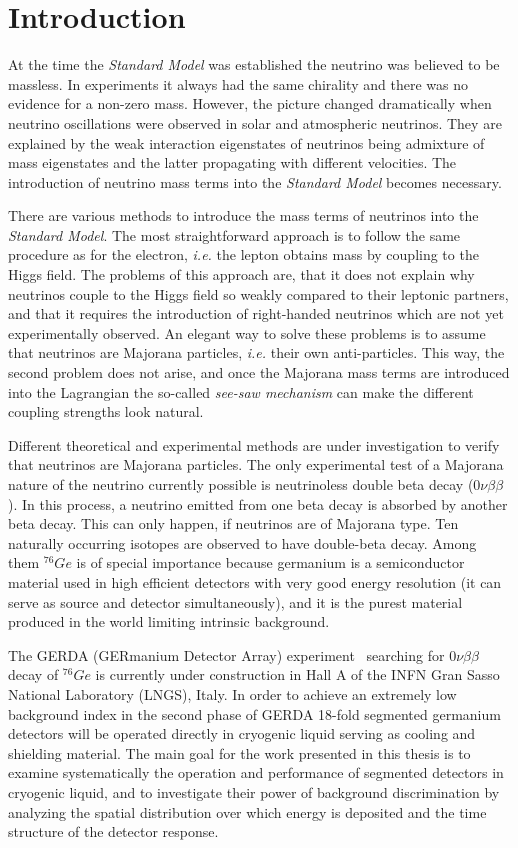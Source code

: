 \chapter{Introduction}
\label{cha:intro}
At the time the \emph{Standard Model} was established the neutrino was believed to be massless. In experiments it always had the same chirality and there was no evidence for a non-zero mass. However, the picture changed dramatically when neutrino oscillations were observed in solar and atmospheric neutrinos. They are explained by the weak interaction eigenstates of neutrinos being admixture of mass eigenstates and the latter propagating with different velocities. The introduction of neutrino mass terms into the \emph{Standard Model}
becomes necessary.

There are various methods to introduce the mass terms of neutrinos into the \emph{Standard Model}. The most straightforward approach is to follow the same procedure as for the electron, \textit{i.e.} the lepton obtains mass by coupling to the Higgs field. The problems of this approach are, that it does not explain why neutrinos couple to the Higgs field so weakly compared to their leptonic partners, and that it requires the introduction of right-handed neutrinos which are not yet experimentally observed. An elegant way to solve these problems is to assume that neutrinos are Majorana particles,
\textit{i.e.} their own anti-particles. This way, the second problem does not arise, and once the Majorana mass terms are introduced into the Lagrangian the so-called \emph{see-saw mechanism} can make the different coupling strengths look natural.

Different theoretical and experimental methods are under investigation to verify that neutrinos are Majorana particles. The only experimental test of a Majorana nature of the neutrino currently possible is neutrinoless double beta decay ($0\nu\beta\beta$). In this process, a neutrino emitted from one beta decay is absorbed by another beta decay. This can only happen, if neutrinos are of Majorana type. Ten naturally occurring isotopes are observed to have double-beta decay. Among them $^{76}Ge$ is of special importance because germanium is a semiconductor material used in high efficient detectors with very good energy resolution (it can serve as source and detector simultaneously), and it is the purest material produced in the world limiting intrinsic background.

The GERDA (GERmanium Detector Array) experiment~\cite{Abt04, Sch05} searching for $0\nu\beta\beta$ decay of $^{76}Ge$ is currently under construction in Hall A of the INFN Gran Sasso National Laboratory (LNGS), Italy. In order to achieve an extremely low background index in the second phase of GERDA 18-fold segmented germanium detectors will be operated directly in cryogenic liquid serving as cooling and shielding material. The main goal for the work presented in this thesis is to examine systematically the operation and performance of segmented detectors in cryogenic liquid, and to investigate their power of background discrimination by analyzing the spatial distribution over which energy is deposited and the time structure of the detector response.

